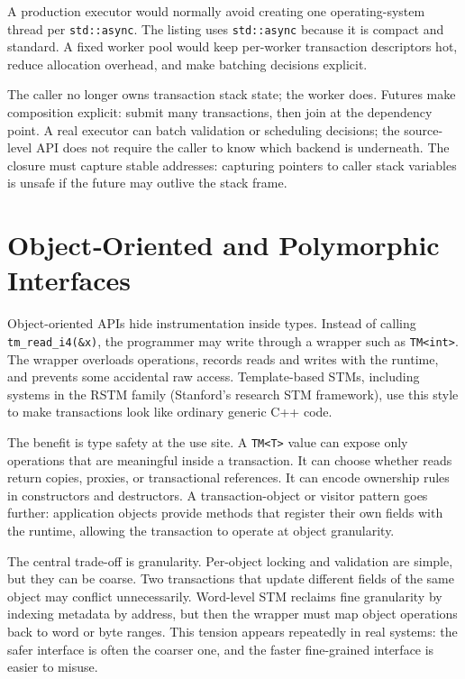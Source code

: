 A production executor would normally avoid creating one operating-system thread per \texttt{std::async}. The listing uses \texttt{std::async} because it is compact and standard. A fixed worker pool would keep per-worker transaction descriptors hot, reduce allocation overhead, and make batching decisions explicit.

The caller no longer owns transaction stack state; the worker does. Futures make composition explicit: submit many transactions, then join at the dependency point. A real executor can batch validation or scheduling decisions; the source-level API does not require the caller to know which backend is underneath. The closure must capture stable addresses: capturing pointers to caller stack variables is unsafe if the future may outlive the stack frame.

\section{Object‑Oriented and Polymorphic Interfaces}

Object-oriented APIs hide instrumentation inside types. Instead of calling \texttt{tm\_read\_i4(\&x)}, the programmer may write through a wrapper such as \texttt{TM<int>}. The wrapper overloads operations, records reads and writes with the runtime, and prevents some accidental raw access. Template-based STMs, including systems in the RSTM family (Stanford's
research STM framework), use this style to make transactions look like ordinary generic C++ code.

The benefit is type safety at the use site. A \texttt{TM<T>} value can expose only operations that are meaningful inside a transaction. It can choose whether reads return copies, proxies, or transactional references. It can encode ownership rules in constructors and destructors. A transaction-object or visitor pattern goes further: application objects provide methods that register their own fields with the runtime, allowing the transaction to operate at object granularity.

The central trade-off is granularity. Per-object locking and validation are simple, but they can be coarse. Two transactions that update different fields of the same object may conflict unnecessarily. Word-level STM reclaims fine granularity by indexing metadata by address, but then the wrapper must map object operations back to word or byte ranges. This tension appears repeatedly in real systems: the safer interface is often the coarser one, and the faster fine-grained interface is easier to misuse.

